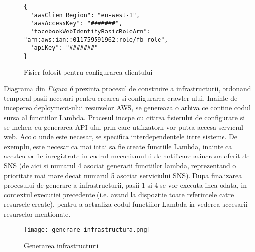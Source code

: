 \begin{figure}[ht]
\begin{verbatim}
{
  "awsClientRegion": "eu-west-1",
  "awsAccessKey": "#######",
  "facebookWebIdentityBasicRoleArn": "arn:aws:iam::011759591962:role/fb-role",
  "apiKey": "#######"
}
\end{verbatim}
\begin{center}
	\caption{Fisier folosit pentru configurarea clientului}\par\medskip
	
\end{center}
\end{figure}

Diagrama din \textit{Figura 6} prezinta procesul de construire a infrastructurii, ordonand temporal pasii necesari pentru crearea si configurarea crawler-ului. Inainte de inceperea deployment-ului resurselor AWS, se genereaza o arhiva ce contine codul sursa al functiilor Lambda. Procesul incepe cu citirea fisierului de configurare si se incheie cu generarea API-ului prin care utilizatorii vor putea accesa serviciul web. Acolo unde este necesar, se specifica interdependentele intre sisteme. De exemplu, este necesar ca mai intai sa fie create functiile Lambda, inainte ca acestea sa fie inregistrate in cadrul mecanismului de notificare asincrona oferit de SNS (de aici si numarul 4 asociat generarii functiilor lambda, reprezentand o prioritate mai mare decat numarul 5 asociat serviciului SNS). Dupa finalizarea procesului de generare a infrastructurii, pasii 1 si 4 se vor executa inca odata, in contextul executiei precedente (i.e. avand la dispozitie toate referintele catre resursele create), pentru a actualiza codul functiilor Lambda in vederea accesarii resurselor mentionate.

\begin{figure}[ht]
\begin{center}
	\texttt{[image: generare-infrastructura.png]}
	\caption{Generarea infrastructurii \cite{diagram-icons-sources}\cite{aws-icons-source}}\par\medskip 

\end{center}
\end{figure}

 